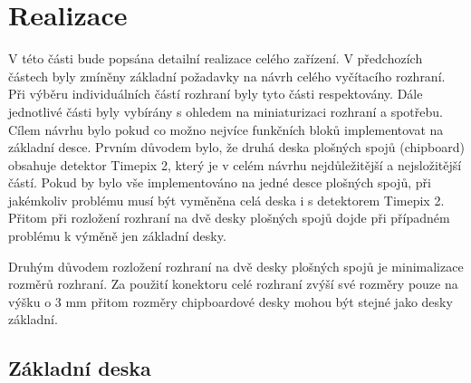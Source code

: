 \chapter{Realizace}
\label{realizace}
V této části bude popsána detailní realizace celého zařízení. V předchozích částech byly zmíněny základní požadavky na návrh celého vyčítacího rozhraní. Při výběru individuálních částí rozhraní byly tyto části respektovány. Dále jednotlivé části byly vybírány s ohledem na miniaturizaci rozhraní a spotřebu. Cílem návrhu bylo pokud co možno nejvíce funkčních bloků implementovat na základní desce. Prvním důvodem bylo, že druhá deska plošných spojů (chipboard) obsahuje detektor Timepix 2, který je v celém návrhu nejdůležitější a nejsložitější částí. Pokud by bylo vše implementováno na jedné desce plošných spojů, při jakémkoliv problému musí být vyměněna celá deska i s detektorem Timepix 2. Přitom při rozložení rozhraní na dvě desky plošných spojů dojde při případném problému k výměně jen základní desky. 
\par Druhým důvodem rozložení rozhraní na dvě desky plošných spojů je minimalizace rozměrů rozhraní. Za použití konektoru celé rozhraní zvýší své rozměry pouze na výšku o 3 mm přitom rozměry chipboardové desky mohou být stejné jako desky základní.

\section{Základní deska}
